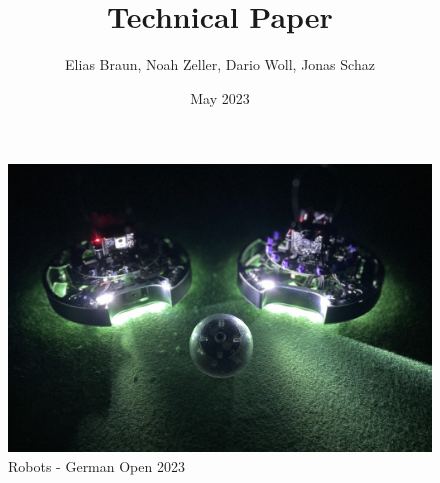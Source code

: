 \documentclass{scrartcl}
\title{Technical Paper}
\author{Elias Braun, Noah Zeller, Dario Woll, Jonas Schaz}
\date{May 2023}
\begin{document}
\maketitle

\begin{figure}[h]
    \centering
    \includegraphics[width=\textwidth]{img/Robotronic-Robots.JPEG}
    \caption{Robots - German Open 2023}
    \label{fig:robots}
\end{figure}
\newpage

\tableofcontents
\newpage








\end{document}
